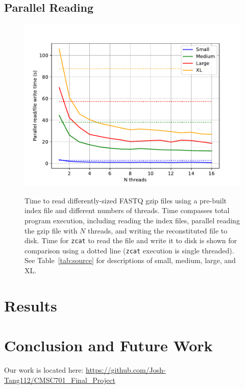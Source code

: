 \documentclass[unnumsec,webpdf,contemporary,large]{oup-authoring-template}
\newcommand{\gzip}{gzip\xspace}
\begin{document}
\subsection{Parallel Reading}


\begin{figure}[h]
    \includegraphics[width=\linewidth]{figs/cores.pdf}
    \label{fig:cores}
    \caption{Time to read differently-sized FASTQ \gzip files using a pre-built
    index file and different numbers of threads. Time compasses total program
    execution, including reading the index files, parallel reading the \gzip
    file with $N$ threads, and writing the reconstituted file to disk. Time for
    \texttt{zcat} to read the file and write it to disk is shown for comparison
    using a dotted line (\texttt{zcat} execution is single threaded). See
    Table~\ref{tab:source} for descriptions of small, medium, large, and XL.}
\end{figure}


\section{Results}

\section{Conclusion and Future Work}

Our work is located here:
\url{https://github.com/Josh-Tang112/CMSC701_Final_Project}



\end{document}
